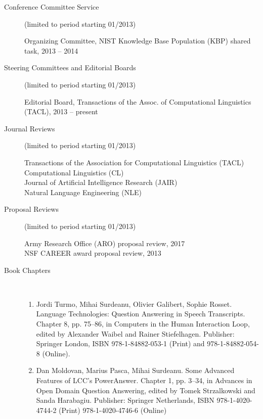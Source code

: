 \documentclass[10pt]{article}
\newcommand{\lmt}{(limited to period starting 01/2013)}
\begin{document}
\begin{description}
\vspace{-.4cm}\item [Conference Committee Service] \lmt \

Organizing Committee, NIST Knowledge Base Population (KBP) shared task, 2013 -- 2014\\

\vspace{-.4cm}\item [Steering Committees and Editorial Boards] \lmt \

Editorial Board, Transactions of the Assoc. of Computational Linguistics (TACL), 2013 -- present \\

\vspace{-.4cm}\item [Journal Reviews] \lmt \

Transactions of the Association for Computational Linguistics (TACL)\\
Computational Linguistics (CL)\\
Journal of Artificial Intelligence Research (JAIR)\\
Natural Language Engineering (NLE) \\

\vspace{-.4cm}\item [Proposal Reviews] \lmt \

Army Research Office (ARO) proposal review, 2017 \\
NSF CAREER award proposal review, 2013 \\

\vspace{-.4cm}\item [Book Chapters]\

\begin{enumerate}

\item Jordi Turmo, Mihai Surdeanu, Olivier Galibert, Sophie Rosset. Language Technologies: Question Answering in Speech Transcripts. Chapter 8, pp. 75--86, in Computers in the Human Interaction Loop, edited by Alexander Waibel and Rainer Stiefelhagen. Publisher: Springer London, ISBN 978-1-84882-053-1 (Print) and 978-1-84882-054-8 (Online).

\item Dan Moldovan, Marius Pasca, Mihai Surdeanu. Some Advanced Features of LCC's PowerAnswer. Chapter 1, pp. 3--34, in Advances in Open Domain Question Answering, edited by Tomek Strzalkowski and Sanda Harabagiu. Publisher: Springer Netherlands, ISBN 978-1-4020-4744-2 (Print) 978-1-4020-4746-6 (Online)


\end{enumerate}
\end{description}
\end{document}
